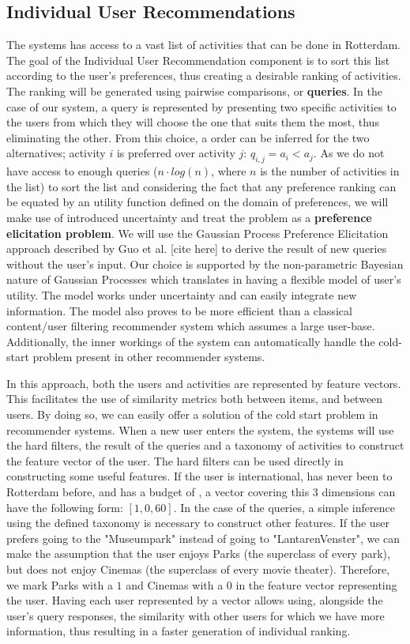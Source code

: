 \documentclass[11pt,a4paper,oneside]{article}
\begin{document}
\subsection{Individual User Recommendations}
The systems has access to a vast list of activities that can be done in Rotterdam. The goal of the Individual User Recommendation component is to sort this list according to the user's preferences, thus creating a desirable ranking of activities. The ranking will be generated using pairwise comparisons, or \textbf{queries}. In the case of our system, a query is represented by presenting two specific activities to the users from which they will choose the one that suits them the most, thus eliminating the other. From this choice, a order can be inferred for the two alternatives; activity $i$ is preferred over activity $j$: $q_{i,j} = a_i < a_j$. As we do not have access to enough queries ($n\cdot log(n)$, where $n$ is the number of activities in the list) to sort the list and considering the fact that any preference ranking can be equated by an utility function defined on the domain of preferences, we will make use of introduced uncertainty and treat the problem as a \textbf{preference elicitation problem}. We will use the Gaussian Process Preference Elicitation approach described by Guo et al. [cite here] to derive the result of new queries without the user's input. Our choice is supported by the non-parametric Bayesian nature of Gaussian Processes which translates in having a flexible model of user's utility. The model works under uncertainty and can easily integrate new information. The model also proves to be more efficient than a classical content/user filtering recommender system which assumes a large user-base. Additionally, the inner workings of the system can automatically handle the cold-start problem present in other recommender systems.

In this approach, both the users and activities are represented by feature vectors. This facilitates the use of similarity metrics both between items, and between users. By doing so, we can easily offer a solution of the cold start problem in recommender systems. When a new user enters the system, the systems will use the hard filters, the result of the queries and a taxonomy of activities to construct the feature vector of the user. The hard filters can be used directly in constructing some useful features. If the user is international, has never been to Rotterdam before, and has a budget of , a vector covering this 3 dimensions can have the following form: $[1, 0, 60]$. In the case of the queries, a simple inference using the defined taxonomy is necessary to construct other features. If the user prefers going to the "Museumpark" instead of going to "LantarenVenster", we can make the assumption that the user enjoys Parks (the superclass of every park), but does not enjoy Cinemas (the superclass of every movie theater). Therefore, we mark Parks with a $1$ and Cinemas with a $0$ in the feature vector representing the user. Having each user represented by a vector allows using, alongside the user's query responses, the similarity with other users for which we have more information, thus resulting in a faster generation of individual ranking.
\end{document}
